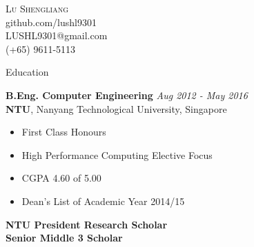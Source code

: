 \documentclass[a4paper, 12pt]{article}
\newenvironment{changemargin}[2]{%
  \begin{list}{}{%
      \setlength{\topsep}{0pt}%
      \setlength{\leftmargin}{#1}%
      \setlength{\rightmargin}{#2}%
      \setlength{\listparindent}{\parindent}%
      \setlength{\itemindent}{\parindent}%
      \setlength{\parsep}{\parskip}%
    }%
  \item[]}{\end{list}
}
\newcommand{\lineover}{
  \begin{changemargin}{-0.05in}{-0.05in}
    \vspace*{-8pt}
    \hrulefill \\
    \vspace*{-2pt}
  \end{changemargin}
}
\newcommand{\header}[1]{
  \begin{changemargin}{-0.6in}{-0.6in}
    \fontsize{15}{15}\scshape{#1}\\
    \lineover
    \vspace*{-4pt}
  \end{changemargin}
}
\newcommand{\contact}[5]{
  \begin{changemargin}{-0.5in}{-0.5in}
    \begin{center}
      {\LARGE \scshape {#1}}\\ \smallskip
      {#2}\\ \smallskip
      {#3}\\ \smallskip
      {#4}   \smallskip
    \end{center}
  \end{changemargin}
}
\newenvironment{body}
{
\vspace*{-16pt}
\begin{changemargin}{-0.25in}{-0.5in}
}
{
\end{changemargin}
}
\begin{document}
\contact{Lu Shengliang}{github.com/lushl9301}{LUSHL9301@gmail.com}{(+65) 9611-5113}





\header{Education}
\begin{body}
  \vspace{14pt}
  \textbf{B.Eng. Computer Engineering} \hfill \emph{Aug 2012 - May 2016} \\
  \textbf{NTU}, Nanyang Technological University, Singapore\\
  \begin{itemize} \itemsep -0pt  \small
  \vspace*{-4pt}
  \item First Class Honours
  \item High Performance Computing Elective Focus
  \item CGPA 4.60 of 5.00
  \item Dean's List of Academic Year 2014/15
  \end{itemize}
  \textbf{NTU President Research Scholar}\\
  \smallskip
  \textbf{Senior Middle 3 Scholar}

\end{body}
\end{document}
